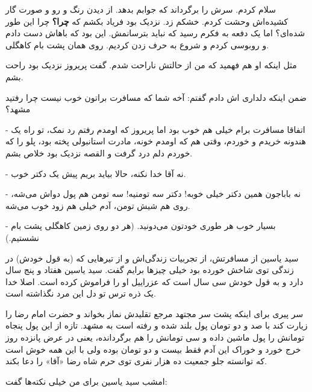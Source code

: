 \documentclass[12pt,a4paper]{book}
\begin{document}
سلام کردم. سرش را برگرداند که جوابم بدهد. از دیدن رنگ و رو و صورت گار کشیده‌اش وحشت کردم. خشکم زد. نزدیک بود فریاد بکشم که \textbf{چرا؟} چرا این طور شده‌ای؟ اما یک دفعه به فکرم رسید که نباید بترسانمش. این بود که باهاش دست دادم و روبوسی کردم و شروع به حرف زدن کردیم. روی همان پشت بام کاهگلی.

مثل اینکه او هم فهمید که من از حالتش ناراحت شدم. گفت پریروز نزدیک بود راحت بشم.

ضمن اینکه دلداری اش دادم گفتم: آخه شما که مسافرت براتون خوب نیست چرا رفتید مشهد؟

- اتفاقا مسافرت برام خیلی هم خوب بود اما پریروز که اومدم رفتم رد نمک، تو راه یک هندونه خریدم و خوردم، وقتی هم که اومدم خونه، مادرت استانبولی پخته بود، پلو  را که خوردم دلم درد گرفت و القصه نزدیک بود خلاص بشم.

- نه آقا خدا نکنه، حالا بیاید بریم پیش یک دکتر خوب.

- نه باباجون همین دکتر خیلی خوبه! دکتر سه تومنیه! سه تومن هم پول دواش می‌شه، روی هم شیش تومن، آدم خیلی هم زود خوب می‌شه.

- بسیار خوب هر طوری خودتون می‌دونید.
(هر دو روی زمین کاهگلی پشت بام نشستیم.)

سید یاسین از مسافرتش، از تجربیات زندگی‌اش و از تیرهایی که (به قول خودش) در زندگی توی شاخش خورده بود خیلی چیزها برایم گفت.
سید یاسین هفتاد و پنج سال دارد و به قول خودش سی سال است که عزراییل او را فراموش کرده است. اصلا خدا یک ذره ترس تو دل این مرد نگذاشته است.

سر پیری برای اینکه پشت سر مجتهد مرجع تقلیدش نماز بخواند و حضرت امام رضا را زیارت کند با صد و دو تومان پول بلند شده و رفته است به مشهد. تازه از این پول پنجاه تومانش را پول ماشین داده و سی تومانش را هم برگردانده، یعنی در عرض پانزده روز خرج خورد و خوراک این آدم فقط بیست و دو تومان بوده ولی با این همه خوش است که توانسته جلو جمعیت ده هزار نفری توی حرم شاه رضا «آقا» را دعا بکند.

امشب سید یاسین برای من خیلی نکته‌ها گفت:
\end{document}
